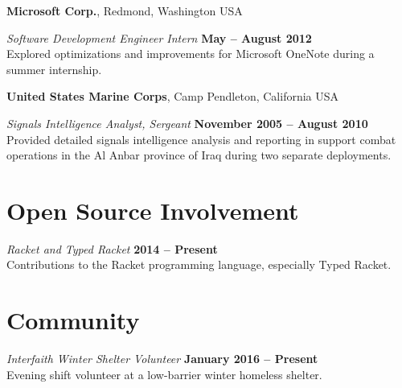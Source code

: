 \documentclass[margin,line]{res}
\begin{document}
\begin{resume}
{\bf Microsoft Corp.}, Redmond, Washington USA

\vspace{-.3cm}
{\em Software Development Engineer Intern} \hfill {\bf May -- August 2012}\\
Explored optimizations and improvements for Microsoft OneNote during a
summer internship.

{\bf United States Marine Corps}, Camp Pendleton, California USA

\vspace{-.3cm}
{\em Signals Intelligence Analyst, Sergeant} \hfill {\bf November 2005 -- August 2010}\\
Provided detailed signals intelligence analysis and reporting in
support combat operations in the Al Anbar province of Iraq during two
separate deployments.

\section{\sc Open Source Involvement}

{\em Racket and Typed Racket} \hfill {\bf 2014 --
  Present}\\ Contributions to the Racket programming language,
especially Typed Racket.

\section{\sc Community}

\vspace{-.3cm} {\em Interfaith Winter Shelter Volunteer} \hfill {\bf
  January 2016 -- Present }\\ Evening shift volunteer at a low-barrier
winter homeless shelter.


\end{resume}
\end{document}
